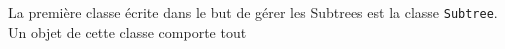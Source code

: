 La première classe écrite dans le but de gérer les Subtrees est la classe \texttt{Subtree}. Un objet de cette classe comporte tout 